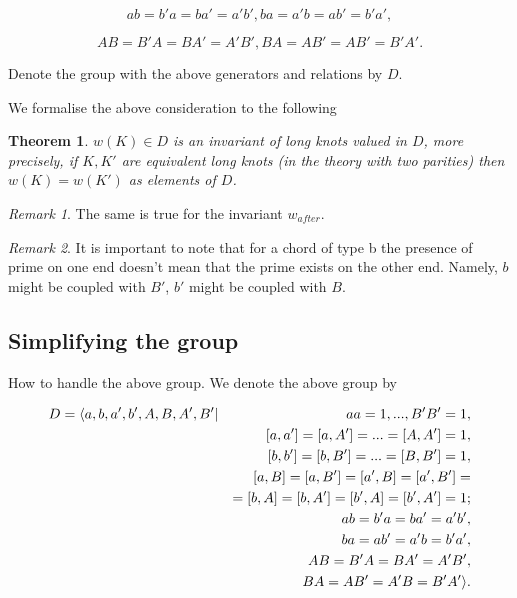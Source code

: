 \documentclass[12pt]{article}
\newtheorem{thm}{Theorem}
\theoremstyle{definition}
\theoremstyle{remark}
\newtheorem{remark}{Remark}
\begin{document}
$$
ab=b'a=ba'=a'b',
ba=a'b=ab'=b'a',
$$

$$
AB=B'A=BA'=A'B',
BA=AB'=AB'=B'A'.
$$



Denote the group with the above generators and relations by $D$.

We formalise the above consideration to the following
\begin{thm}
$w(K)\in D$ is an invariant of long knots valued in $D$, more precisely, if $K,K'$ are equivalent
long knots (in the theory with two parities) then $w(K)=w(K')$ as elements of $D$.
\label{th1}
\end{thm}

\begin{remark}
The same is true for the invariant $w_{after}$.
\end{remark}

\begin{remark}
It is important to note that for a chord of type b the presence of prime on
one end doesn't mean that the prime exists on the other end. Namely, $b$ might be coupled with $B'$,
$b'$ might be coupled with $B$.
\end{remark}





\subsection{Simplifying the group}
How to handle the above group.
We denote the above group by



\begin{eqnarray*}
D=\langle a,b,a',b',A,B,A',B'&|& aa=1, ..., B'B'=1,\cr
&&[a,a']=[a,A']=... = [A,A']=1,\cr
&&[b,b']=[b,B']=... = [B,B']=1,\cr
&&[a,B]=[a,B']=[a',B]=[a',B']= \\
&&=[b,A]=[b,A']=[b',A]=[b',A']=1; \cr
&&ab=b'a=ba'=a'b',\cr
&&ba=ab'=a'b=b'a',\cr
&&AB=B'A=BA'=A'B',\cr
&&BA=AB'=A'B=B'A'
\rangle.\end{eqnarray*}
\end{document}
